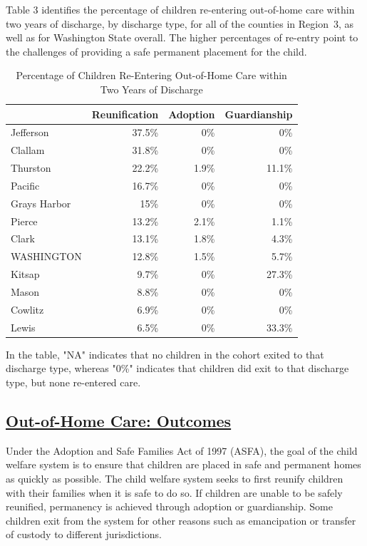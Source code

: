\documentclass{article}\usepackage{graphicx, color}
\begin{document}
Table 3 identifies the percentage of children re-entering out-of-home care within two years of discharge, by discharge type, for all of the counties in Region~3, as well as for Washington State overall. The higher percentages of re-entry point to the challenges of providing a safe permanent placement for the child.
\nopagebreak[3]
\begin{table}[ht]
\centering
\caption{Percentage of Children Re-Entering Out-of-Home Care within Two Years of Discharge} 
\begin{tabular}{lrrr}
  \toprule
 & Reunification & Adoption & Guardianship \\ 
  \midrule
Jefferson & 37.5\% & 0\% & 0\% \\ 
  Clallam & 31.8\% & 0\% & 0\% \\ 
  Thurston & 22.2\% & 1.9\% & 11.1\% \\ 
  Pacific & 16.7\% & 0\% & 0\% \\ 
  Grays Harbor & 15\% & 0\% & 0\% \\ 
  Pierce & 13.2\% & 2.1\% & 1.1\% \\ 
  Clark & 13.1\% & 1.8\% & 4.3\% \\ 
  WASHINGTON & 12.8\% & 1.5\% & 5.7\% \\ 
  Kitsap & 9.7\% & 0\% & 27.3\% \\ 
  Mason & 8.8\% & 0\% & 0\% \\ 
  Cowlitz & 6.9\% & 0\% & 0\% \\ 
  Lewis & 6.5\% & 0\% & 33.3\% \\ 
   \bottomrule
\end{tabular}
\end{table}


In the table, "NA" indicates that no children in the cohort exited to that discharge type, whereas "0\%" indicates that children did exit to that discharge type, but none re-entered care.

\subsection{\href{http://www.partnersforourchildren.org/child-well-being/visualizations/out-home-care/outcomes}
    {Out-of-Home Care: Outcomes}
}
Under the Adoption and Safe Families Act of 1997 (ASFA), the goal of the child welfare system is to ensure that children are placed in safe and permanent homes as quickly as possible. The child welfare system seeks to first reunify children with their families when it is safe to do so. If children are unable to be safely reunified, permanency is achieved through adoption or guardianship. Some children exit from the system for other reasons such as emancipation or transfer of custody to different jurisdictions.
\end{document}
